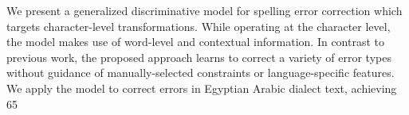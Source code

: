 We present a generalized discriminative model for spelling error correction which targets character-level transformations. While operating at the character level, the model makes use of word-level and contextual information. In contrast to previous work, the proposed approach learns to correct a variety of error types without guidance of manually-selected constraints or language-specific features. We apply the model to correct errors in Egyptian Arabic dialect text, achieving 65\\%
